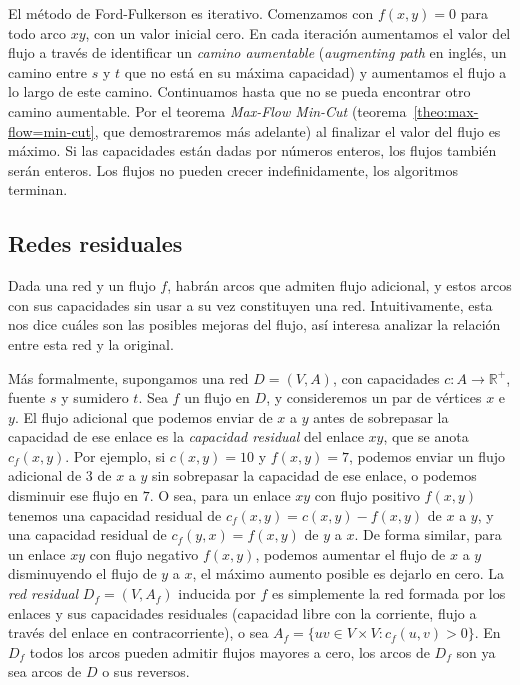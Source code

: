   El método de Ford-Fulkerson es iterativo.
  Comenzamos con \(f(x, y) = 0\) para todo arco \(x y\),
  con un valor inicial cero.
  En cada iteración aumentamos el valor del flujo
  a través de identificar
  un \emph{camino aumentable}%
  (\emph{\foreignlanguage{english}{augmenting path}} en inglés,
   un camino entre \(s\) y \(t\) que no está en su máxima capacidad)
  y aumentamos el flujo a lo largo de este camino.
  Continuamos hasta que no se pueda encontrar
  otro camino aumentable.
  Por el teorema \emph{\foreignlanguage{english}{Max-Flow Min-Cut}}
  (teorema~\ref{theo:max-flow=min-cut},
   que demostraremos más adelante)
  al finalizar el valor del flujo es máximo.
  Si las capacidades
  están dadas por números enteros,
  los flujos también serán enteros.
  Los flujos no pueden crecer indefinidamente,
  los algoritmos terminan.

\subsection{Redes residuales}
\label{sec:red-residual}

  Dada una red y un flujo \(f\),
  habrán arcos que admiten flujo adicional,
  y estos arcos con sus capacidades sin usar
  a su vez constituyen una red.
  Intuitivamente,
  esta nos dice cuáles son las posibles mejoras del flujo,
  así interesa analizar la relación entre esta red y la original.

  Más formalmente,
  supongamos una red \(D = (V, A)\),
  con capacidades \(c \colon A \rightarrow \mathbb{R^+}\),
  fuente \(s\) y sumidero \(t\).
  Sea \(f\) un flujo en \(D\),
  y consideremos un par de vértices \(x\) e \(y\).
  El flujo adicional que podemos enviar de \(x\) a \(y\)
  antes de sobrepasar la capacidad de ese enlace
  es la \emph{capacidad residual} del enlace \(x y\),
  que se anota \(c_f(x, y)\).
  Por ejemplo,
  si \(c(x, y) = 10\) y \(f(x, y) = 7\),
  podemos enviar un flujo adicional de \(3\) de \(x\) a \(y\)
  sin sobrepasar la capacidad de ese enlace,
  o podemos disminuir ese flujo en \(7\).
  O sea,
  para un enlace \(x y\)
  con flujo positivo \(f(x, y)\)
  tenemos una capacidad residual
  de \(c_f(x, y) = c(x, y) - f(x, y)\)
  de \(x\) a \(y\),
  y una capacidad residual
  de \(c_f(y, x) = f(x, y)\) de \(y\) a \(x\).
  De forma similar,
  para un enlace \(x y\) con flujo negativo \(f(x, y)\),
  podemos aumentar el flujo de \(x\) a \(y\)
  disminuyendo el flujo de \(y\) a \(x\),
  el máximo aumento posible es dejarlo en cero.
  La \emph{red residual} \(D_f = (V, A_f)\) inducida por \(f\)
  es simplemente la red formada por los enlaces
  y sus capacidades residuales
  (capacidad libre con la corriente,
   flujo a través del enlace en contracorriente),
  o sea \(A_f = \{u v \in V \times V \colon c_f (u, v) > 0\}\).
  En \(D_f\) todos los arcos pueden admitir flujos mayores a cero,
  los arcos de \(D_f\) son ya sea arcos de \(D\) o sus reversos.

